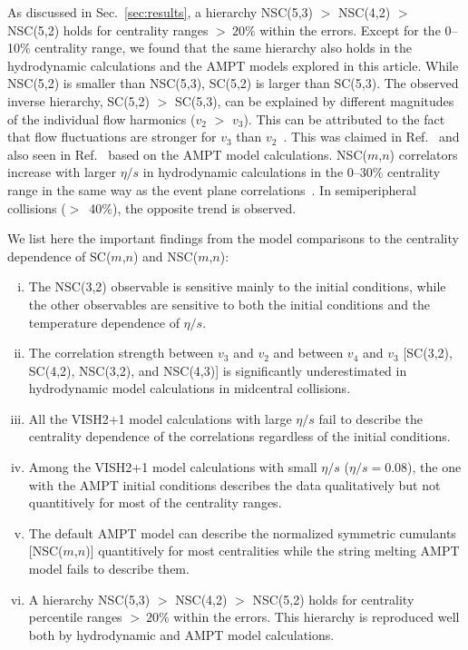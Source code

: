 As discussed in Sec.~\ref{sec:results}, a hierarchy NSC(5,3) $>$ NSC(4,2) $>$ NSC(5,2) holds for centrality ranges $>~20\%$ within the errors.
Except for the 0--10\% centrality range, we found that the same hierarchy also holds in the hydrodynamic calculations and the AMPT models explored in this article.
While NSC(5,2) is smaller than NSC(5,3), SC(5,2) is larger than SC(5,3).
The observed inverse hierarchy, SC(5,2) $>$ SC(5,3), can be explained by different magnitudes of the individual flow harmonics ($v_2$ $>$ $v_3$). 
This can be attributed to the fact that flow fluctuations are stronger for $v_3$ than $v_2$~\cite{Aad:2013xma}. This was claimed in Ref.~\cite{Zhu:2016puf} and also seen in Ref.~\cite{Bhalerao:2014xra} based on the AMPT model calculations. 
NSC($m$,$n$) correlators increase with larger $\eta/s$ in hydrodynamic calculations in the 0--30\% centrality range in the same way as the event plane correlations~\cite{Bhalerao:2013ina,Teaney:2013dta}. In semiperipheral collisions ($>$~40\%), the opposite trend is observed.

We list here the important findings from the model comparisons to the centrality dependence of SC($m$,$n$) and NSC($m$,$n$):
\begin{enumerate}[(i)]
	\item The NSC(3,2) observable is sensitive mainly to the initial conditions, while the other observables are sensitive to both the initial conditions and the temperature dependence of $\eta/s$.
	\item The correlation strength between $v_3$ and $v_2$ and between $v_4$ and $v_3$ [SC(3,2), SC(4,2), NSC(3,2), and NSC(4,3)] is significantly underestimated in hydrodynamic model calculations in midcentral collisions.
	\item All the VISH2+1 model calculations with large $\eta/s$ fail to describe the centrality dependence of the correlations regardless of the initial conditions.
	\item Among the VISH2+1 model calculations with small $\eta/s$ ($\eta/s=0.08$), the one with the AMPT initial conditions describes the data qualitatively but not quantitively for most of the centrality ranges.
	\item The default AMPT model can describe the normalized symmetric cumulants [NSC($m$,$n$)] quantitively for most centralities while the string melting AMPT model fails to describe them.
	\item A hierarchy NSC(5,3) $>$ NSC(4,2) $>$ NSC(5,2) holds for centrality percentile ranges $>~20\%$ within the errors. This hierarchy is reproduced well both by hydrodynamic and AMPT model calculations.
\end{enumerate}

